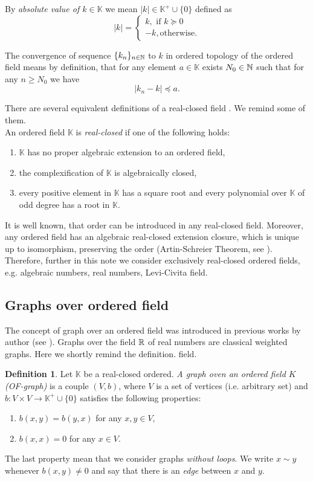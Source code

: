 \documentclass[a4paper,12pt]{amsart}
\theoremstyle{definition}
\newtheorem{definition}{Definition}
\newcommand{\K}{\mathbb{K}}
\begin{document}
By \emph{absolute value of $k\in \K$} we mean $|k|\in \K^+\cup\{0\}$ defined as 
\begin{equation*}
|k|=\begin{cases}
k, \mbox{ if }k\succeq 0\\
-k, \mbox{otherwise.}
\end{cases}
\end{equation*}

The convergence of sequence $\{k_n\}_{n\in \Bbb N}$ to $k$ in ordered topology of the ordered field means by definition, that for any element $a\in \K$ exists $N_0\in \Bbb N$ such that for any $n\ge N_0$ we have
$$
|k_n-k|\preceq a.
$$

There are several equivalent definitions of a real-closed field \cite[p. 38]{DalesHughWoodin}. We remind some of them.\\

An ordered field $\K$ is {\em real-closed} if one of the following holds:
\begin{enumerate}
\item
$\K$ has no proper algebraic extension to an ordered field,
\item
the complexification of $\K$ is algebraically closed,
\item
every positive element in $\K$ has a square root and every polynomial over $\K$ of odd degree has a root in $\K$.
\end{enumerate}

It is well known, that order can be introduced in any real-closed field. Moreover, any ordered field has an algebraic real-closed extension closure, which is unique up to isomorphism, preserving the order (Artin-Schreier Theorem, see \cite[p. 38]{DalesHughWoodin}). Therefore, further in this note we consider exclusively real-closed ordered fields, e.g. algebraic numbers, real numbers, Levi-Civita field.

\subsection{Graphs over ordered field}
The concept of graph over an ordered field was introduced in previous works by author (see \cite{Muranova1, Muranova2}). Graphs over the field $\Bbb R$ of real numbers are classical weighted graphs. Here we shortly remind the definition.  field. 
\begin{definition}
Let $\K$ be a real-closed ordered. \emph{A graph oven an ordered field $K$ (OF-graph)}  is a couple $(V, b)$, where $V$ is a set of vertices (i.e. arbitrary set)
and $b:V\times V\rightarrow \K^+\cup\{0\}$ satisfies the following properties:
\begin{enumerate}
\item
$b(x,y)=b(y,x)$ for any $x,y\in V$,
\item
$b(x,x)= 0$ for any $x\in V$.
\end{enumerate}
\end{definition}
The last property mean that we consider graphs {\em without loops}. We write $x\sim y$ whenever $b(x,y)\ne 0$ and say that there is an {\em edge} between $x$ and $y$. 
\end{document}
